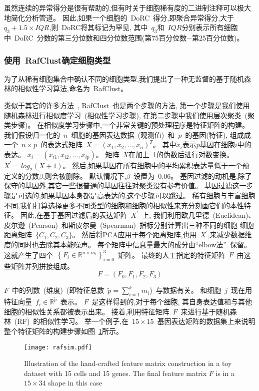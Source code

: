 虽然连续的异常得分是很有帮助的,但有时关于细胞稀有度的二进制注释可以极大地简化分析管道。
因此,如果一个细胞的~DoRC~得分,即聚合异常得分,大于~$q_3 + 1.5 \times IQR$,则~DoRC将其标记为罕见,
其中~$q_3$和~$IQR$分别表示所有细胞中~DoRC~分数的第三分位数和四分位数范围(第75百分位数$-$第25百分位数)。

\subsubsection{使用~RafClust确定细胞类型}
\label{subsec:rafclust} 
为了从稀有细胞集合中确认不同的细胞类型,我们提出了一种无监督的基于随机森林的相似性学习算法,命名为~RafClust。

类似于其它的许多方法~\cite{kiselev2017sc3,pouyan2018random,mohammadi2018geometric,sinha2018dropclust,Srinivasan511626,Li530378,zheng2019sinnlrr},
RafClust~也是两个步骤的方法,
第一个步骤是我们使用随机森林进行相似度学习~(相似性学习步骤),
在第二步骤中我们使用层次聚类~(聚类步骤)。
在相似度学习步骤中,一个非常关键的预处理程序是特征矩阵的构建。
我们假设归一化的~$n$~细胞的基因表达数据~(观测值)~和~$p$~的基因(特征),
组成成一个~$n \times p$~的表达式矩阵~$X=\left(x_{1}, x_{2}, \ldots, x_{n} \right)^ T$。
其中$x_{i}$表示$p$基因在细胞$i$中的表达。
$x_{i}=\left(x_{i1}, x_{i2} ,\ldots, x_{ip} \right)$。
矩阵~$X$在加上~1的伪数后进行对数变换。
$X^{\prime} = log_2 (X + 1)$。
然后,如果基因在所有细胞中的平均累积表达量低于一个预定义的分数$\beta$,则会被删除。
默认情况下,$\beta$~设置为~0.06。 
基因过滤的动机是,除了保守的基因外,其它一些很普通的基因往往对聚类没有参考价值。
基因过滤这一步骤是可选的,如果基因本身都是高表达的,这个步骤可以跳过。
稀有细胞与丰富细胞不同,我们打算选择更多不同类型的细胞和细胞的相似性来充分刻画它们的本性特征。
因此,在基于基因过滤后的表达矩阵~$X^{\prime}$~上,
我们利用欧几里德~(Euclidean)、皮尔逊~(Pearson)~和斯皮尔曼~(Spearman)~指标分别计算出三种不同的细胞-细胞距离矩阵~$\{C_1, C_2, C_3\}$。
然后将PCA应用于每个距离矩阵,也用~$X^{\prime}$,来减少数据维度的同时也去除其本能噪声。
每个矩阵中信息量最大的成分由``elbow法''~\cite{thorndike1953belongs}保留。
这就产生了四个~$\left\{ {F}_{i} \in \mathbb {R} ^ {n \times m_{i}} \right\}_{i = 0}^{3}$~矩阵。
最终的人工指定的特征矩阵~$F$~由这些矩阵并列拼接组成。
\begin{equation}
\label{lab:f}
{F} = ({F}_{0}, {F}_{1}, {F}_{2}, {F}_{3})
\end{equation}

$F$~中的列数~(维度)~(即特征总数~$\tilde {p} = \sum_{i = 1}^{k} m_{i}$)~与数据有关。
和细胞~$j$~现在用特征向量~$f_{i} \in \mathbb {R} ^ {\tilde{p}}$~表示。
$F$~是这样得到的,对于每个细胞,
其自身表达值和与其他细胞的相似性关系都被表示出来。
接着,利用特征矩阵~$F$~来进行基于随机森林~(RF)~的相似性学习。
举一个例子,在~$15 \times 15$~基因表达矩阵的数据集上来说明整个特征矩阵的构建步骤如图~\ref{fig:rafsim}所示。
\begin{figure}[!htbp]
    \centering
    \texttt{[image: rafsim.pdf]}
    \caption{Illustration of the hand-crafted feature matrix construction in a toy dataset with 15 cells and 15 genes. The final feature matrix $F$ is in a $15 \times 34$ shape in this case}
    \label{fig:rafsim}
\end{figure}

